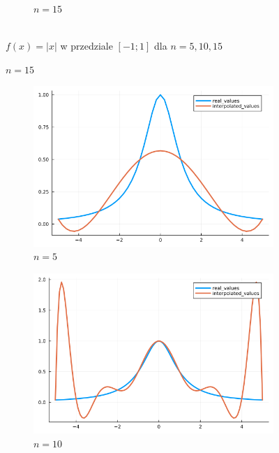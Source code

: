 \documentclass{article}
\def\v{0.47}
\begin{document}
\begin{figure}[H]
\begin{subfigure}[b]{\v\linewidth}
			\caption{$n = 15$}
		\end{subfigure}
	\\{$f(x) = |x|$ w przedziale $[-1;1]$ dla $n = 5,10,15$}
	\end{figure}

	\begin{figure}[H]
	    \centering
		\begin{subfigure}[b]{\v\linewidth}
			\includegraphics[width=\linewidth]{graphs/zad6.b.5.png}
			\caption{$n = 5$}
		\end{subfigure}
		\begin{subfigure}[b]{\v\linewidth}
			\includegraphics[width=\linewidth]{graphs/zad6.b.10.png}
			\caption{$n = 10$}
		\end{subfigure}
		\begin{subfigure}[b]{\v\linewidth}

\end{subfigure}
\end{figure}
\end{document}
